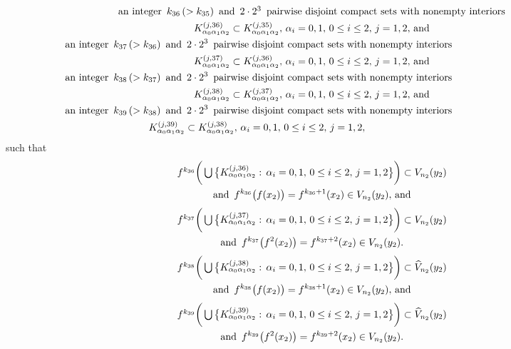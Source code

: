 \documentclass[12pt]{article}
\newcommand{\al}{\alpha}
\begin{document}
\begin{multline*}
$$
\text{an integer} \,\,\, k_{36} \, (> k_{35}) \,\,\, \text{and} \,\,\, 2 \cdot 2^3 \,\,\, \text{pairwise disjoint compact sets with nonempty interiors} \\      K_{\al_0\al_1\al_2}^{(j,36)} \subset K_{\al_0\al_1\al_2}^{(j,35)}, \, \al_i = 0, 1, \, 0 \le i \le 2, \, j = 1, 2, \, \text{and} \\
\,\,\,\,\, \text{an integer} \,\,\, k_{37} \, (> k_{36}) \,\,\, \text{and} \,\,\, 2 \cdot 2^3 \,\,\, \text{pairwise disjoint compact sets with nonempty interiors}\qquad\qquad\qquad\qquad\qquad\quad\,\,\, \\ 
K_{\al_0\al_1\al_2}^{(j,37)} \subset K_{\al_0\al_1\al_2}^{(j,36)}, \, \al_i = 0, 1, \, 0 \le i \le 2, \, j = 1, 2, \, \text{and}  \\
\,\,\,\,\, \text{an integer} \,\,\, k_{38} \, (> k_{37}) \,\,\, \text{and} \,\,\, 2 \cdot 2^3 \,\,\, \text{pairwise disjoint compact sets with nonempty interiors}\qquad\qquad\qquad\qquad\qquad\quad\,\,\, \\      
K_{\al_0\al_1\al_2}^{(j,38)} \subset K_{\al_0\al_1\al_2}^{(j,37)}, \, \al_i = 0, 1, \, 0 \le i \le 2, \, j = 1, 2, \, \text{and} \\
\,\,\,\,\, \text{an integer} \,\,\, k_{39} \, (> k_{38}) \,\,\, \text{and} \,\,\, 2 \cdot 2^3 \,\,\, \text{pairwise disjoint compact sets with nonempty interiors}\qquad\qquad\qquad\qquad\qquad\quad\,\,\, \\ 
K_{\al_0\al_1\al_2}^{(j,39)} \subset K_{\al_0\al_1\al_2}^{(j,38)}, \, \al_i = 0, 1, \, 0 \le i \le 2, \, j = 1, 2,  \qquad\qquad\qquad\qquad\qquad\quad
$$
\end{multline*}
such that
\begin{multline*}
$$
f^{k_{36}}\bigg(\bigcup \big\{ K_{\al_0\al_1\al_2}^{(j,36)}: \, \al_i = 0, 1, \, 0 \le i \le 2, \, j = 1, 2 \big\}\bigg) \subset V_{n_2}(y_2) \\ \text{and} \,\,\, f^{k_{36}}\big(f(x_2)\big) = f^{k_{36}+1}(x_2) \in V_{n_2}(y_2), \, \text{and}
$$
\end{multline*}
\begin{multline*}
$$
f^{k_{37}}\bigg(\bigcup \big\{ K_{\al_0\al_1\al_2}^{(j,37)}: \, \al_i = 0, 1, \, 0 \le i \le 2, \, j = 1, 2 \big\}\bigg) \subset V_{n_2}(y_2) \\ \text{and} \,\,\, f^{k_{37}}\big(f^2(x_2)\big) = f^{k_{37}+2}(x_2) \in V_{n_2}(y_2).
$$
\end{multline*}
\begin{multline*}
$$
f^{k_{38}}\bigg(\bigcup \big\{ K_{\al_0\al_1\al_2}^{(j,38)}: \, \al_i = 0, 1, \, 0 \le i \le 2, \, j = 1, 2 \big\}\bigg) \subset \widehat  V_{n_2}(y_2) \\ \text{and} \,\,\, f^{k_{38}}\big(f(x_2)\big) = f^{k_{38}+1}(x_2) \in V_{n_2}(y_2), \, \text{and}
$$
\end{multline*}
\begin{multline*}
$$
f^{k_{39}}\bigg(\bigcup \big\{ K_{\al_0\al_1\al_2}^{(j,39)}: \, \al_i = 0, 1, \, 0 \le i \le 2, \, j = 1, 2 \big\}\bigg) \subset \widehat  V_{n_2}(y_2) \\ \text{and} \,\,\, f^{k_{39}}\big(f^2(x_2)\big) = f^{k_{39}+2}(x_2) \in V_{n_2}(y_2).
$$
\end{multline*}
\end{document}
